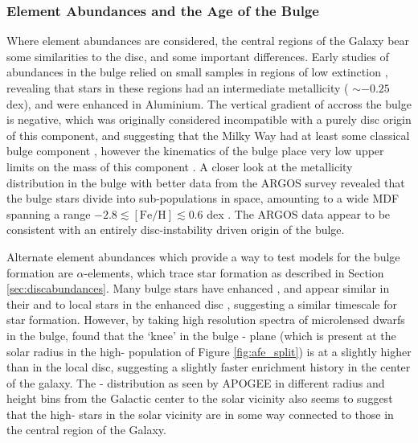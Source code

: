 \subsubsection{Element Abundances and the Age of the Bulge}
Where element abundances are considered, the central regions of the Galaxy bear some similarities to the disc, and some important differences. Early studies of abundances in the bulge relied on small samples in regions of low extinction \citep[e.g.][]{1994ApJS...91..749M}, revealing that stars in these regions had an intermediate metallicity (\feh{} $\sim -0.25$ dex), and were enhanced in Aluminium. The vertical gradient of \feh{} accross the bulge is negative, which was originally considered incompatible with a purely disc origin of this component, and suggesting that the Milky Way had at least some classical bulge component \citep[e.g.][]{2008A&A...486..177Z}, however the kinematics of the bulge place very low upper limits on the mass of this component \citep[e.g. $\sim 8\%$;][]{2010ApJ...720L..72S}. A closer look at the metallicity distribution in the bulge with better data from the ARGOS survey revealed that the bulge stars divide into sub-populations in \feh{} space, amounting to a wide MDF spanning a range $-2.8 \lesssim \mathrm{[Fe/H]}\lesssim 0.6$ dex \citep{2013MNRAS.430..836N}. The ARGOS data appear to be consistent with an entirely disc-instability driven origin of the bulge.

Alternate element abundances which provide a way to test models for the bulge formation are $\alpha$-elements, which trace star formation as described in Section \ref{sec:discabundances}. Many bulge stars have enhanced \afe{}, and appear similar in their \afe{} and \feh{} to local stars in the \afe{} enhanced disc \citep{2010A&A...513A..35A,2015A&A...584A..46G}, suggesting a similar timescale for star formation. However, by taking high resolution spectra of microlensed dwarfs in the bulge, \citet{2013A&A...549A.147B} found that the `knee' in the bulge \afe{}-\feh{} plane (which is present at the solar radius in the high-\afe{} population of Figure \ref{fig:afe_split}) is at a slightly higher \feh{} than in the local disc, suggesting a slightly faster enrichment history in the center of the galaxy. The \afe{}-\feh{} distribution as seen by APOGEE in different radius and height bins from the Galactic center to the solar vicinity \citep{2016PASA...33...22N} also seems to suggest that the high-\afe{} stars in the solar vicinity are in some way connected to those in the central region of the Galaxy.

